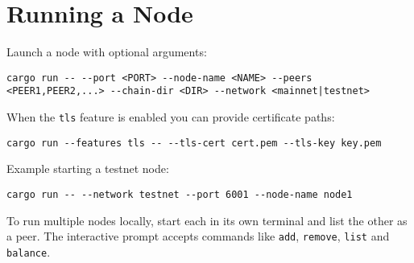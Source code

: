 \chapter{Running a Node}
Launch a node with optional arguments:
\begin{verbatim}
cargo run -- --port <PORT> --node-name <NAME> --peers <PEER1,PEER2,...> --chain-dir <DIR> --network <mainnet|testnet>
\end{verbatim}
When the \texttt{tls} feature is enabled you can provide certificate paths:
\begin{verbatim}
cargo run --features tls -- --tls-cert cert.pem --tls-key key.pem
\end{verbatim}
Example starting a testnet node:
\begin{verbatim}
cargo run -- --network testnet --port 6001 --node-name node1
\end{verbatim}
To run multiple nodes locally, start each in its own terminal and list the other as a peer. The interactive prompt accepts commands like \texttt{add}, \texttt{remove}, \texttt{list} and \texttt{balance}.
